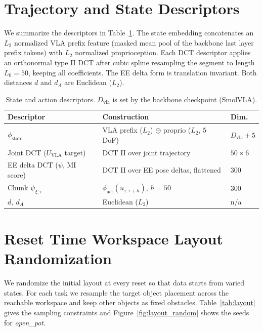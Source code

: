\documentclass{article}
\begin{document}
\section{Trajectory and State Descriptors}
\label{app:descriptors}

We summarize the descriptors in Table~\ref{tab:descriptors}. The state embedding
concatenates an $L_2$ normalized VLA prefix feature (masked mean pool of the
backbone last layer prefix tokens) with $L_2$ normalized proprioception. Each DCT
descriptor applies an orthonormal type II DCT after cubic spline resampling the
segment to length $L_0{=}50$, keeping all coefficients. The EE delta form is
translation invariant. Both distances $d$ and $d_A$ are Euclidean ($L_2$).

\begin{table}[h]
\centering
\caption{State and action descriptors. $D_{\mathrm{vla}}$ is set by the backbone checkpoint (SmolVLA).}
\label{tab:descriptors}
\small
\setlength{\tabcolsep}{6pt}
\begin{tabular}{lll}
\toprule
\textbf{Descriptor} & \textbf{Construction} & \textbf{Dim.} \\
\midrule
$\phi_{\mathrm{state}}$ & VLA prefix ($L_2$) $\oplus$ proprio ($L_2$, $5$ DoF) & $D_{\mathrm{vla}}{+}5$ \\
Joint DCT ($U_{\mathrm{VLA}}$ target) & DCT II over joint trajectory & $50{\times}6$ \\
EE delta DCT ($\psi$, MI score) & DCT II over EE pose deltas, flattened & $300$ \\
Chunk $\psi_{\xi,\tau}$ & $\phi_{\mathrm{act}}(u_{\tau:\tau+h})$, $h{=}50$ & $300$ \\
$d,\ d_A$ & Euclidean ($L_2$) & n/a \\
\bottomrule
\end{tabular}
\end{table}

\section{Reset Time Workspace Layout Randomization}
\label{app:layout}

We randomize the initial layout at every reset so that data starts from varied
states. For each task we resample the target object placement across the reachable
workspace and keep other objects as fixed obstacles. Table~\ref{tab:layout} gives
the sampling constraints and Figure~\ref{fig:layout_random} shows the seeds for
\textit{open\_pot}.
\end{document}
